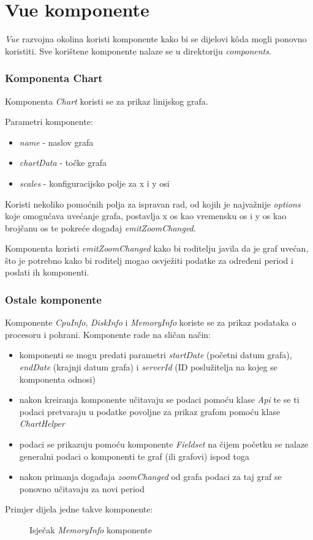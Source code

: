 \documentclass[zavrsnirad]{fer}
\begin{document}
\section{Vue komponente}
\textit{Vue} razvojna okolina koristi komponente kako bi se dijelovi kôda mogli ponovno koristiti. Sve korištene komponente nalaze se u direktoriju \textit{components}.

\subsubsection{Komponenta Chart}
Komponenta \textit{Chart} koristi se za prikaz linijskog grafa.

Parametri komponente:
\begin{itemize}
	\item \textit{name} - naslov grafa
	\item \textit{chartData} - točke grafa
	\item \textit{scales} - konfiguracijsko polje za x i y osi
\end{itemize}
Koristi nekoliko pomoćnih polja za ispravan rad, od kojih je najvažnije  \textit{options} koje omogućava uvećanje grafa, postavlja x os kao vremensku os i y os kao brojčanu os  te pokreće događaj \textit{emitZoomChanged}.

Komponenta koristi \textit{emitZoomChanged}  kako bi roditelju javila da je graf uvećan, što je potrebno kako bi roditelj mogao osvježiti podatke za određeni period i poslati ih komponenti.


\subsubsection{Ostale komponente}
Komponente \textit{CpuInfo}, \textit{DiskInfo} i \textit{MemoryInfo} koriste se za prikaz podataka o procesoru i pohrani. Komponente rade na sličan način:
\begin{itemize}
	\item komponenti se mogu predati parametri \textit{startDate} (početni datum grafa), \textit{endDate} (krajnji datum grafa) i \textit{serverId} (ID poslužitelja na kojeg se komponenta odnosi)
	\item nakon kreiranja komponente učitavaju se podaci pomoću klase \textit{Api} te se ti podaci pretvaraju u podatke povoljne za prikaz grafom pomoću klase \textit{ChartHelper}
	\item podaci se prikazuju pomoću komponente \textit{Fieldset} na čijem početku se nalaze generalni podaci o komponenti te graf (ili grafovi) ispod toga
	\item nakon primanja događaja \textit{zoomChanged} od grafa podaci za taj graf se ponovno učitavaju za novi period
\end{itemize}
Primjer dijela jedne takve komponente:
\begin{figure}[htb]
	\centering
	
	\caption{Isječak \textit{MemoryInfo} komponente}
\end{figure}
\FloatBarrier
\end{document}
